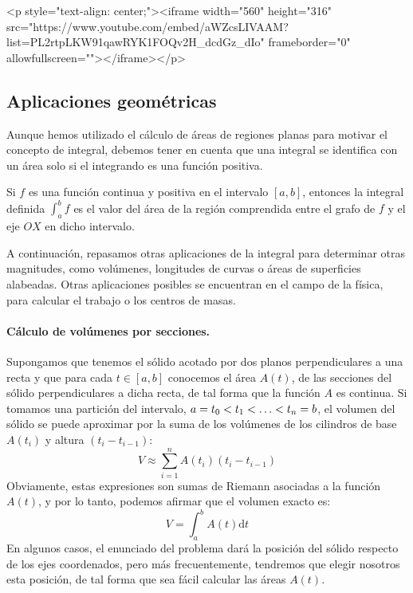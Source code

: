 \begin{rawhtml}
<p style="text-align: center;"><iframe width="560" height="316" src="https://www.youtube.com/embed/aWZcsLIVAAM?list=PL2rtpLKW91qawRYK1FOQv2H_dcdGz_dIo" frameborder="0" allowfullscreen=""></iframe></p>
\end{rawhtml}


\subsection{Aplicaciones geométricas}\label{sec:geom}

Aunque hemos utilizado el cálculo de áreas de regiones planas para motivar el concepto de integral, debemos tener en cuenta que una integral se identifica con un área solo si el integrando es una función positiva.
%
\begin{teorema}
Si $f$ es una función continua y positiva en el intervalo
$[a,b]$, entonces la integral definida $\displaystyle\int_a^b f$ es el valor del área de la región comprendida entre el grafo de $f$ y el eje $OX$ en dicho intervalo.
\end{teorema}

A continuación, repasamos otras aplicaciones de la integral para determinar otras magnitudes, como volúmenes, longitudes de curvas o áreas de superficies alabeadas.
Otras aplicaciones posibles se encuentran en el campo de la física, para calcular el trabajo o los centros de masas.

\paragraph{Cálculo de volúmenes por secciones.}
Supongamos que tenemos el sólido acotado
por dos planos perpendiculares a una recta y que para cada $t\in[a,b]$ conocemos el área $A(t)$, de las secciones del sólido perpendiculares a dicha recta, de tal forma que la función $A$ es continua.
Si tomamos una partición del intervalo, $a=t_0\sle t_1\sle \dots\sle t_n=b$, el volumen del sólido se puede aproximar por la suma de los volúmenes de los cilindros de base $A(t_i)$ y altura $(t_i-t_{i-1})$:
\[
V\approx \sum_{i=1}^n A(t_i)(t_i-t_{i-1})
\]
Obviamente, estas expresiones son sumas de Riemann asociadas a la función $A(t)$, y por lo tanto, podemos afirmar que el volumen exacto es:
\[
V=\int_a^b A(t)\mathrm dt
\]
En algunos casos, el enunciado del problema dará la posición del sólido
respecto de los ejes coordenados, pero más frecuentemente, tendremos que elegir
nosotros esta posición, de tal forma que sea fácil calcular las áreas
$A(t)$.

